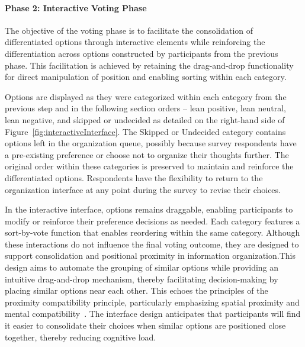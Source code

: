 \paragraph{Phase 2: Interactive Voting Phase}

The objective of the voting phase is to facilitate the consolidation of differentiated options through interactive elements while reinforcing the differentiation across options constructed by participants from the previous phase. This facilitation is achieved by retaining the drag-and-drop functionality for direct manipulation of position and enabling sorting within each category.

Options are displayed as they were categorized within each category from the previous step and in the following section orders -- lean positive, lean neutral, lean negative, and skipped or undecided as detailed on the right-hand side of Figure~\ref{fig:interactiveInterface}. The Skipped or Undecided category contains options left in the organization queue, possibly because survey respondents have a pre-existing preference or choose not to organize their thoughts further. The original order within these categories is preserved to maintain and reinforce the differentiated options. Respondents have the flexibility to return to the organization interface at any point during the survey to revise their choices.

In the interactive interface, options remains draggable, enabling participants to modify or reinforce their preference decisions as needed. Each category features a sort-by-vote function that enables reordering within the same category. Although these interactions do not influence the final voting outcome, they are designed to support consolidation and positional proximity in information organization.This design aims to automate the grouping of similar options while providing an intuitive drag-and-drop mechanism, thereby facilitating decision-making by placing similar options near each other. This echoes the principles of the proximity compatibility principle, particularly emphasizing spatial proximity and mental compatibility~\cite{wickens1990proximity}. The interface design anticipates that participants will find it easier to consolidate their choices when similar options are positioned close together, thereby reducing cognitive load.

